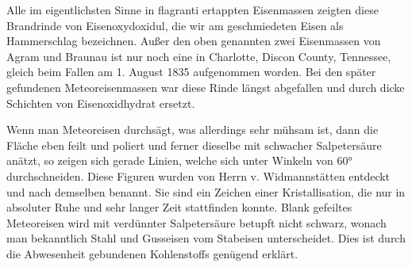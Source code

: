 \documentclass[a4paper, 11pt, oneside, german]{article}
\begin{document}
Alle im eigentlichsten Sinne in flagranti ertappten Eisenmassen zeigten diese Brandrinde von Eisenoxydoxidul, die wir am geschmiedeten Eisen als Hammerschlag bezeichnen. Außer den oben genannten zwei Eisenmassen von Agram und Braunau ist nur noch eine in Charlotte, Discon County, Tennessee, gleich beim Fallen am 1. August 1835 aufgenommen worden. Bei den später gefundenen Meteoreisenmassen war diese Rinde längst abgefallen und durch dicke Schichten von Eisenoxidhydrat ersetzt.

Wenn man Meteoreisen durchsägt, was allerdings sehr mühsam ist, dann die Fläche eben feilt und poliert und ferner dieselbe mit schwacher Salpetersäure anätzt, so zeigen sich gerade Linien, welche sich unter Winkeln von 60° durchschneiden. Diese Figuren wurden von Herrn v. Widmannstätten entdeckt und nach demselben benannt. Sie sind ein Zeichen einer Kristallisation, die nur in absoluter Ruhe und sehr langer Zeit stattfinden konnte. Blank gefeiltes Meteoreisen wird mit verdünnter Salpetersäure betupft nicht schwarz, wonach man bekanntlich Stahl und Gusseisen vom Stabeisen unterscheidet. Dies ist durch die Abwesenheit gebundenen Kohlenstoffs genügend erklärt.
\end{document}
